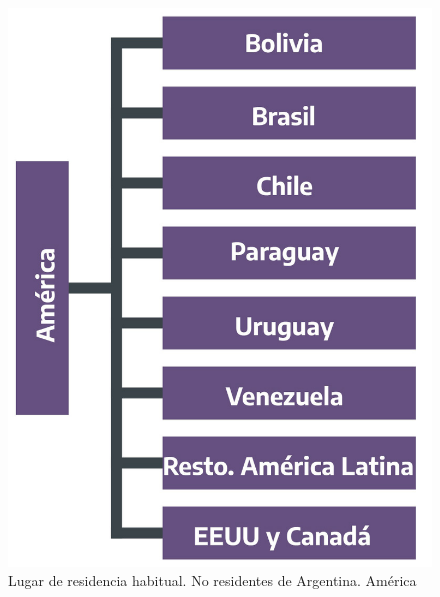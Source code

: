 \documentclass[
]{book}
\begin{document}
\begin{figure}

{\centering \includegraphics[width=1\linewidth]{imagenes/figura_2_2_1} 

}

\caption{Lugar de residencia habitual. No residentes de Argentina. América}\label{fig:america-latina}
\end{figure}
\end{document}

